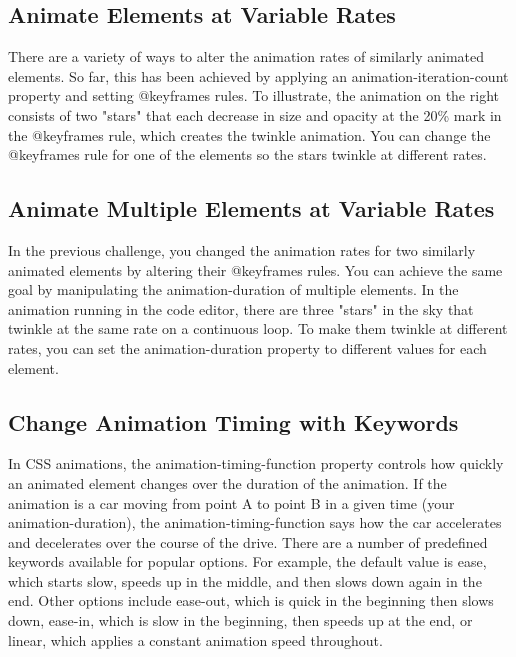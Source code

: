 \documentclass{article}%
\begin{document}
\subsection{Animate Elements at Variable Rates}%
\label{subsec:AnimateElementsatVariableRates}%
There are a variety of ways to alter the animation rates of similarly animated elements. So far, this has been achieved by applying an animation{-}iteration{-}count property and setting @keyframes rules.\newline%
To illustrate, the animation on the right consists of two "stars" that each decrease in size and opacity at the 20\% mark in the @keyframes rule, which creates the twinkle animation. You can change the @keyframes rule for one of the elements so the stars twinkle at different rates.\newline%

%
\subsection{Animate Multiple Elements at Variable Rates}%
\label{subsec:AnimateMultipleElementsatVariableRates}%
In the previous challenge, you changed the animation rates for two similarly animated elements by altering their @keyframes rules. You can achieve the same goal by manipulating the animation{-}duration of multiple elements.\newline%
In the animation running in the code editor, there are three "stars" in the sky that twinkle at the same rate on a continuous loop. To make them twinkle at different rates, you can set the animation{-}duration property to different values for each element.\newline%

%
\subsection{Change Animation Timing with Keywords}%
\label{subsec:ChangeAnimationTimingwithKeywords}%
In CSS animations, the animation{-}timing{-}function property controls how quickly an animated element changes over the duration of the animation. If the animation is a car moving from point A to point B in a given time (your animation{-}duration), the animation{-}timing{-}function says how the car accelerates and decelerates over the course of the drive.\newline%
There are a number of predefined keywords available for popular options. For example, the default value is ease, which starts slow, speeds up in the middle, and then slows down again in the end. Other options include ease{-}out, which is quick in the beginning then slows down, ease{-}in, which is slow in the beginning, then speeds up at the end, or linear, which applies a constant animation speed throughout.\newline%
\end{document}

